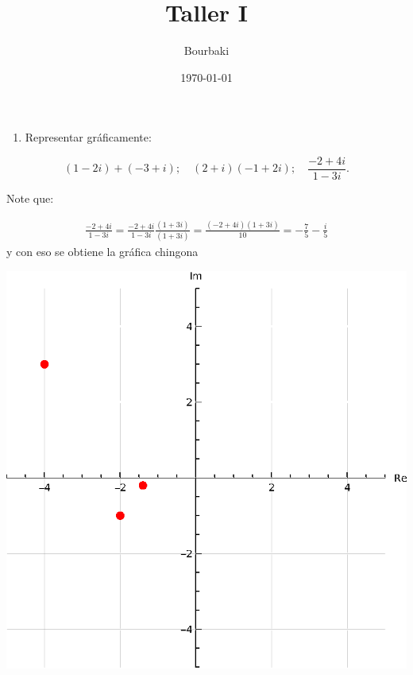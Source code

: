 \documentclass[11pt]{article}
\title{Taller I}
\author{Bourbaki}
\date{\today}
\begin{document}
\maketitle
\begin{enumerate}
  \item Representar gráficamente:
\end{enumerate}

$$
(1-2 i)+(-3+i) ; \quad(2+i)(-1+2 i) ; \quad \frac{-2+4 i}{1-3 i}.
$$

Note que:

\begin{align*}
  \frac{-2+4 i}{1-3 i}=\frac{-2+4 i}{1-3 i}\frac{(1+3i)}{(1+3i)}=\frac{(-2+4i)(1+3i)}{10}=-\frac{7}{5}-\frac{i}{5}
\end{align*}
y con eso se obtiene la gráfica chingona
\begin{center}
\includegraphics[scale=0.8]{Graphics/Punto1.eps}
\end{center}
\end{document}
